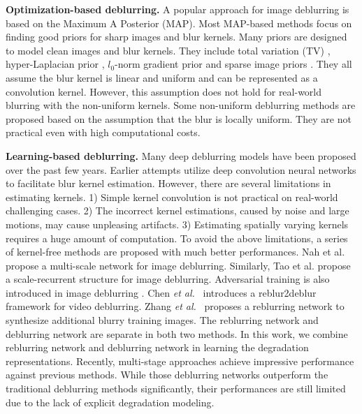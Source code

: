 \documentclass[runningheads]{llncs}
\def\etal{{\em et al.}}
\begin{document}
\noindent\textbf{Optimization-based deblurring.}
A popular approach for image deblurring is based on the Maximum A Posterior (MAP). Most MAP-based methods focus on finding good priors for sharp images and blur kernels. 
Many priors are designed to model clean images and blur kernels. They include total variation (TV) \cite{total_variation}, hyper-Laplacian prior \cite{hyper_laplacian}, $l_0$-norm gradient prior \cite{L0_norm} and sparse image priors \cite{sparse_prior}.
They all assume the blur kernel is linear and uniform and can be represented as a convolution kernel. However, this assumption does not hold for real-world blurring with the non-uniform kernels. Some non-uniform deblurring methods \cite{non-uniform-deblurring,restore_spatially_variant,rotational_motion_deblurring,removing_non_uniform_motion} are proposed based on the assumption that the blur is locally uniform. They are not practical even with high computational costs.

\noindent\textbf{Learning-based deblurring.}
Many deep deblurring models have been proposed over the past few years. 
Earlier attempts \cite{Learning_to_deblur,Learning_CNN_non_uniform} utilize deep convolution neural networks to facilitate blur kernel estimation. However, there are several limitations \cite{deblur-multi-scale} in estimating kernels. 1) Simple kernel convolution is not practical on real-world challenging cases. 2) The incorrect kernel estimations, caused by noise and large motions, may cause unpleasing artifacts. 3) Estimating spatially varying kernels requires a huge amount of computation. To avoid the above limitations, a series of kernel-free methods \cite{tao2018srndeblur,deblur-multi-scale,kupyn2018deblurgan,kupyn2019deblurgan,deepstacked,gao2019dynamic,suin2020spatially,park2020multi,zhang2020deblurring,Zamir2021MPRNet,MIMO_UNet,HINet} are proposed with much better performances. Nah et al. \cite{deblur-multi-scale} propose a multi-scale network for image deblurring. Similarly, Tao et al. \cite{tao2018srndeblur} propose a scale-recurrent structure for image deblurring. Adversarial training is also introduced in image deblurring \cite{kupyn2018deblurgan,kupyn2019deblurgan}. Chen \etal~\cite{reblur2deblur} introduces a reblur2deblur framework for video deblurring. Zhang \etal~\cite{zhang2020deblurring} proposes a reblurring network to synthesize additional blurry training images. The reblurring network and deblurring network are separate in both two methods. In this work, we combine reblurring network and deblurring network in learning the degradation representations.
Recently, multi-stage approaches \cite{deepstacked,suin2020spatially,Zamir2021MPRNet,HINet} achieve impressive performance against previous methods.
While those deblurring networks outperform the traditional deblurring methods significantly, their performances are still limited due to the lack of explicit degradation modeling. 
\end{document}
